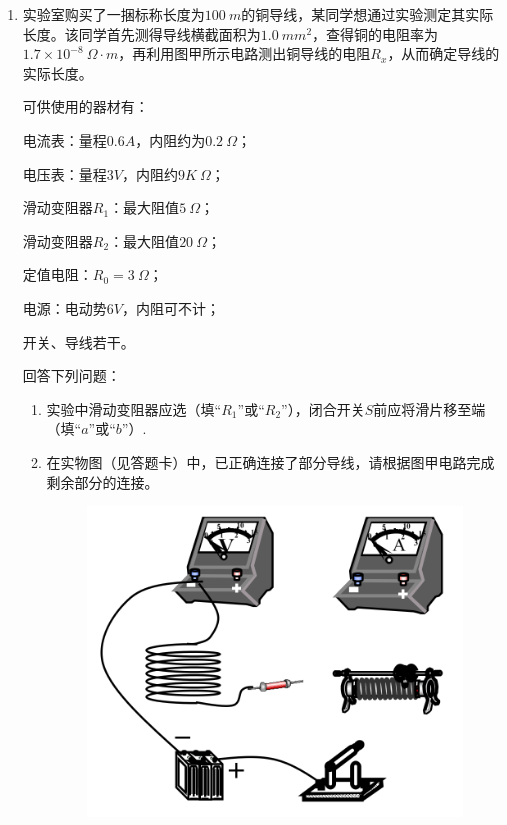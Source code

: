 \begin{enumerate}[leftmargin=0em]
{}




\item 
{}
实验室购买了一捆标称长度为$ 100 \ m $的铜导线，某同学想通过实验测定其实际长度。该同学首先测得导线横截面积为$ 1.0\ mm^{2} $，查得铜的电阻率为$1.7 \times 10 ^ { - 8 } \ \Omega \cdot m$，再利用图甲所示电路测出铜导线的电阻$ R_x $，从而确定导线的实际长度。

可供使用的器材有：

\begin{minipage}[h!]{0.7\linewidth}
\vspace{0.3em}
电流表：量程$ 0.6A $，内阻约为$ 0.2 \ \Omega $；

电压表：量程$ 3V $，内阻约$ 9K \ \Omega $；

滑动变阻器$ R_{1} $：最大阻值$ 5 \ \Omega $；

滑动变阻器$ R_{2} $：最大阻值$ 20 \ \Omega $；

定值电阻：$ R_0=3 \ \Omega $；

电源：电动势$ 6V $，内阻可不计；

开关、导线若干。
\vspace{0.3em}
\end{minipage}
\hfill
\begin{minipage}[h!]{0.3\linewidth}
\flushright
\vspace{0.3em}

\vspace{0.3em}
\end{minipage}

回答下列问题：

\begin{enumerate}
\renewcommand{\labelenumi}{\arabic{enumi}.}
\item
实验中滑动变阻器应选（填“$ R_{1} $”或“$ R_{2} $”），闭合开关$ S $前应将滑片移至端（填“$ a $”或“$ b $”）. 
\item 
在实物图（见答题卡）中，已正确连接了部分导线，请根据图甲电路完成剩余部分的连接。
\begin{figure}[h!]
\centering
\includegraphics[width=0.5\linewidth]{picture/screenshot008}
\end{figure}



\end{enumerate}
\end{enumerate}
